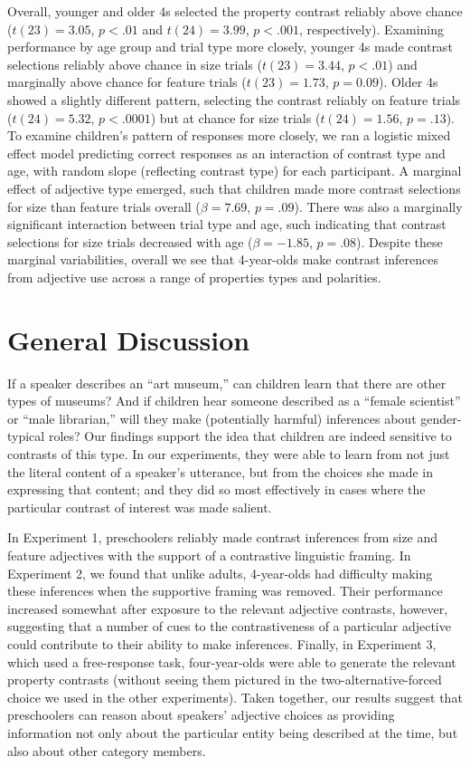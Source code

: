 \documentclass[man]{apa2}
\begin{document}
Overall, younger and older 4s selected the property contrast reliably above chance ($t(23) = 3.05$, $p<.01$ and $t(24) = 3.99$, $p<.001$, respectively). Examining performance by age group and trial type more closely, younger 4s made contrast selections reliably above chance in size trials ($t(23)=3.44$, $p<.01$) and marginally above chance for feature trials ($t(23)=1.73$, $p=0.09$). Older 4s showed a slightly different pattern, selecting the contrast reliably on feature trials ($t(24)=5.32$, $p<.0001$) but at chance for size trials ($t(24)=1.56$, $p=.13$). To examine children's pattern of responses more closely, we ran a logistic mixed effect model predicting correct responses as an interaction of contrast type and age, with random slope (reflecting contrast type) for each participant.  A marginal effect of adjective type emerged, such that children made more contrast selections for size than feature trials overall ($\beta = 7.69$, $p = .09$). There was also a marginally significant interaction between trial type and age, such indicating that contrast selections for size trials decreased with age ($\beta = -1.85$, $p = .08$).  Despite these marginal variabilities, overall we see that 4-year-olds make contrast inferences from adjective use across a range of properties types and polarities. 


\section{General Discussion}

If a speaker describes an ``art museum,'' can children learn that there are other types of museums? And if children hear someone described as a ``female scientist'' or ``male librarian,'' will they make (potentially harmful) inferences about gender-typical roles? Our findings support the idea that children are indeed sensitive to contrasts of this type. In our experiments, they were able to learn from not just the literal content of a speaker's utterance, but from the choices she made in expressing that content; and they did so most effectively in cases where the particular contrast of interest was made salient.

In Experiment 1, preschoolers reliably made contrast inferences from size and feature adjectives with the support of a contrastive linguistic framing.  In Experiment 2, we found that unlike adults, 4-year-olds had difficulty making these inferences when the supportive framing was removed. Their performance increased somewhat after exposure to the relevant adjective contrasts, however, suggesting that a number of cues to the contrastiveness of a particular adjective could contribute to their ability to make inferences. Finally, in Experiment 3, which used a free-response task, four-year-olds were able to generate the relevant property contrasts (without seeing them pictured in the two-alternative-forced choice we used in the other experiments). Taken together, our results suggest that preschoolers can reason about speakers' adjective choices as providing information not only about the particular entity being described at the time, but also about other category members. 
\end{document}
